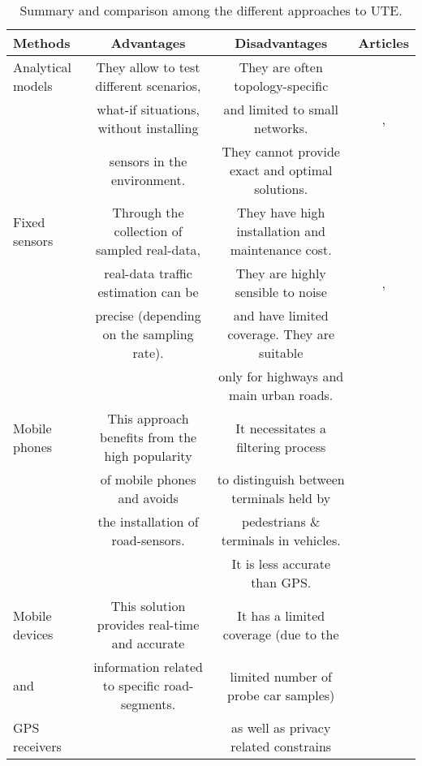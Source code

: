 \documentclass[10pt,onecolumn]{article}
\begin{document}
\begin{table*}[ht]
\centering
\scriptsize
\caption{Summary and comparison among the different approaches to UTE.}
\label{sumEstim}
\begin{tabulary}{0.001\textwidth}{ | l | c| c| c| }

  \hline      
  \hline      
  \textbf{Methods} & \textbf{Advantages} & \textbf{Disadvantages}  & \textbf{Articles}  \\ 
  \hline      \hline   
  
  Analytical models 	& They allow to test different scenarios, & They are often topology-specific &\cite{Osorio2009,Castillo2008}\\
	                		& what-if situations, without installing  & and limited to small networks. &\cite{LopezNeri2010, Castillo2012, Tonguz2009},\\
			                & sensors in the environment. 		        & They cannot provide exact and optimal solutions.  & \cite{Tan2009,Dimitriou2008,Srinivasan2009,Chan2012}\\
			
   \hline Fixed sensors  & Through the collection of sampled real-data, & They have high installation and maintenance cost.     &\cite{Coifman2009}   \\
			           & real-data traffic estimation can be          & They are highly sensible to noise  &\cite{Lightill1955,Richards1956,vanHinsbergen2012}, \\
			           & precise (depending on the sampling rate).    & and have limited coverage. They are suitable 	&\cite{Tyagi2012,Leow2008,Shannon1949,Kanhere2010} \\
			           & 																							& only for highways and main urban roads.  &\\
   \hline Mobile phones 	& This approach benefits from the high popularity & It necessitates a filtering process  &\cite{Valerio2009,Calabrese2011}  \\
			& of mobile phones and avoids            	& to distinguish between terminals held by & 	\\
			& the installation of road-sensors.		& pedestrians \& terminals in vehicles. &		\\
			& 		   					& It is less accurate than GPS.		 &			\\
   \hline Mobile devices & This solution provides real-time and accurate   & It has a limited coverage (due to the & \cite{Messelodi2009, Tao2012, Li2009}   \\
  and			       &  information related to specific road-segments. & limited number of probe car samples)	 & \cite{Kong2013,Zhu2013,geop2p,Rybicki2007} \\
  GPS receivers	 & 						                                   & as well as privacy related constrains	& \cite{Jedrzej2009,Picone2011a,Picone2011b,Picone2012D4V}\\
  

\end{tabulary}
\end{table*}
\end{document}
